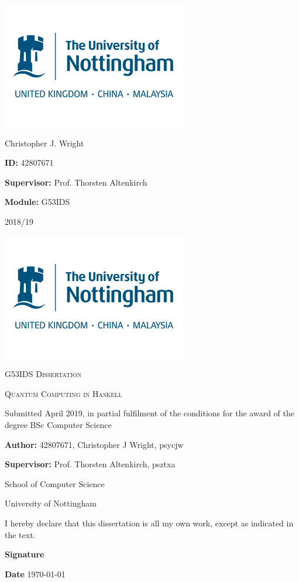 \documentclass[a4paper,10pt, titlepage, twoside]{article}
\begin{document}
\begin{titlepage}
	\centering
	\includegraphics{uonlogo}\par
	\vfill
	{\huge Christopher J. Wright \par}
	\vfill
	{\huge \textbf{ID:} 42807671\par}
	{\huge \textbf{Supervisor:} Prof. Thorsten Altenkirch\par}
	{\huge \textbf{Module:} G53IDS\par}
	\vfill
	{\huge 2018/19}
\end{titlepage}
\shipout\null
\thispagestyle{empty}
\begin{titlepage}
	\centering
	\includegraphics{uonlogo}	
	\vfill
	{\scshape\large G53IDS Dissertation \par}
	{\scshape\LARGE Quantum Computing in Haskell \par}
	\vfill
	{\large Submitted April 2019, in partial fulfilment of the conditions for the award of the degree BSc Computer Science \par}
	\vfill
	{\large \textbf{Author:} 42807671, Christopher J Wright, psycjw \par}
	{\large \textbf{Supervisor:} Prof. Thorsten Altenkirch, psztxa \par}
	\vfill
	{\large School of Computer Science \par University of Nottingham}
	\vfill
	{I hereby declare that this dissertation is all my own work, except as indicated in the text.\par}
	\vfill
	\begin{flushleft}
		{\large \textbf{Signature} \par}
		\vfill
		{\large \textbf{Date} \hspace{2cm} \today\par}
	\end{flushleft}
\end{titlepage}
\shipout\null
\end{document}
